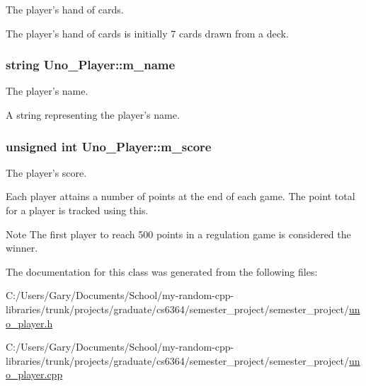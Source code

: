 \-The player's hand of cards. 

\-The player's hand of cards is initially 7 cards drawn from a deck. \hypertarget{class_uno___player_a06af109b4d621efa14ba98e4c9395739}{
\subsubsection[{m\-\_\-name}]{\setlength{\rightskip}{0pt plus 5cm}string {\bf \-Uno\-\_\-\-Player\-::m\-\_\-name}}}
\label{class_uno___player_a06af109b4d621efa14ba98e4c9395739}


\-The player's name. 

\-A string representing the player's name. \hypertarget{class_uno___player_a9805f306a500b1898c0a0922d76de444}{
\subsubsection[{m\-\_\-score}]{\setlength{\rightskip}{0pt plus 5cm}unsigned int {\bf \-Uno\-\_\-\-Player\-::m\-\_\-score}}}
\label{class_uno___player_a9805f306a500b1898c0a0922d76de444}


\-The player's score. 

\-Each player attains a number of points at the end of each game. \-The point total for a player is tracked using this. \begin{DoxyNote}{\-Note}
\-The first player to reach 500 points in a regulation game is considered the winner. 
\end{DoxyNote}


\-The documentation for this class was generated from the following files\-:\begin{DoxyCompactItemize}
\item 
\-C\-:/\-Users/\-Gary/\-Documents/\-School/my-\/random-\/cpp-\/libraries/trunk/projects/graduate/cs6364/semester\-\_\-project/semester\-\_\-project/\hyperlink{uno__player_8h}{uno\-\_\-player.\-h}\item 
\-C\-:/\-Users/\-Gary/\-Documents/\-School/my-\/random-\/cpp-\/libraries/trunk/projects/graduate/cs6364/semester\-\_\-project/semester\-\_\-project/\hyperlink{uno__player_8cpp}{uno\-\_\-player.\-cpp}\end{DoxyCompactItemize}
